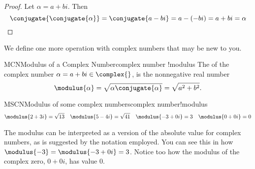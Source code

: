 %
\begin{proof}
Let $\alpha=a+bi$.  Then
%
\begin{equation*}
\conjugate{\conjugate{\alpha}}=\conjugate{a-bi}=a-(-bi)=a+bi=\alpha
\end{equation*}
%
\end{proof}
%
%
We define one more operation with complex numbers that may be new to you.
%
\begin{definition}{MCN}{Modulus of a Complex Number}{complex number !modulus}
The  of the complex number $\alpha=a+bi\in\complex{\null}$, is the nonnegative real number
%
\begin{equation*}
\modulus{\alpha}=\sqrt{\alpha\conjugate{\alpha}}=\sqrt{a^2+b^2}.
\end{equation*}
%
\end{definition}
%
\begin{example}{MSCN}{Modulus of some complex numbers}{complex number!modulus}
%
\begin{align*}
\modulus{2+3i}=\sqrt{13}&&\modulus{5-4i}=\sqrt{41}&&
\modulus{-3+0i}=3&&\modulus{0+0i}=0
\end{align*}
%
\end{example}
%
The modulus can be interpreted as a version of the absolute value for complex numbers, as is suggested by the notation employed.  You can see this in how $\modulus{-3}=\modulus{-3+0i}=3$.  Notice too how the modulus of the complex zero, $0+0i$, has value $0$.
%

